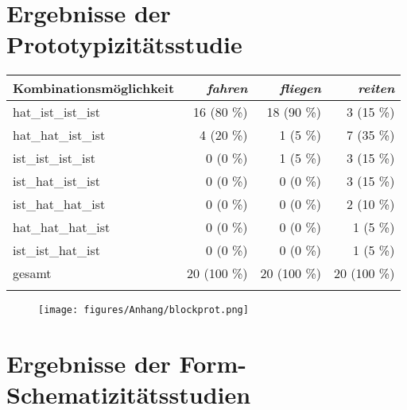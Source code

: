 \section{Ergebnisse der Prototypizitätsstudie}
\label{ergebnisseproto}

\vfill
\begin{table}[H]
\begin{tabular}{lrrr}
  \lsptoprule
Kombinationsmöglichkeit & \textit{fahren} & \textit{fliegen} & \textit{reiten} \\ 
  \midrule
  hat\_ist\_ist\_ist & 16 (80 \%) & 18 (90 \%) & 3 (15 \%) \\
	hat\_hat\_ist\_ist & 4 (20 \%) & 1 (5 \%) & 7 (35 \%) \\
	ist\_ist\_ist\_ist & 0 (0 \%) & 1 (5 \%) & 3 (15 \%)\\
	ist\_hat\_ist\_ist &  0 (0 \%) & 0 (0 \%) & 3 (15 \%) \\ 
	ist\_hat\_hat\_ist &  0 (0 \%) & 0 (0 \%) & 2 (10 \%) \\ 
	hat\_hat\_hat\_ist &   0 (0 \%) & 0 (0 \%) & 1 (5 \%) \\  
 ist\_ist\_hat\_ist &  0 (0 \%) & 0 (0 \%) & 1 (5 \%) \\ 
\midrule
gesamt & 20 (100 \%) & 20 (100 \%) & 20 (100 \%)\\
   \lspbottomrule
\end{tabular}
\label{antwortmusteraus}
\end{table}
\vfill\pagebreak

\begin{figure}
\texttt{[image: figures/Anhang/blockprot.png]} 
\label{blockprot}
\end{figure}

\section{Ergebnisse der Form-Schematizitätsstudien}
\label{ergebnisseschema}

